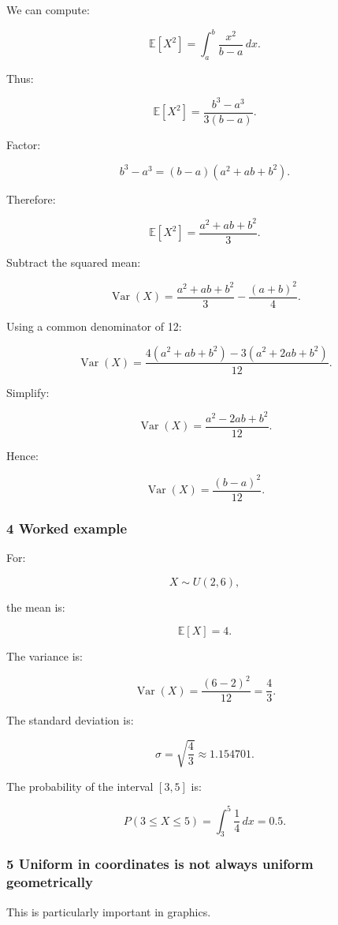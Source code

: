 We can compute:

\[
 \mathbb E[X^2] = \int_a^b\frac{x^2}{b-a}\,dx.
\]

Thus:

\[
 \mathbb E[X^2] = \frac{b^3-a^3}{3(b-a)}.
\]

Factor:

\[
 b^3-a^3=(b-a)(a^2+ab+b^2).
\]

Therefore:

\[
 \mathbb E[X^2] = \frac{a^2+ab+b^2}{3}.
\]

Subtract the squared mean:

\[
 \operatorname{Var}(X) = \frac{a^2+ab+b^2}{3} -\frac{(a+b)^2}{4}.
\]

Using a common denominator of 12:

\[
 \operatorname{Var}(X) = \frac{ 4(a^2+ab+b^2)-3(a^2+2ab+b^2) }{12}.
\]

Simplify:

\[
 \operatorname{Var}(X) = \frac{a^2-2ab+b^2}{12}.
\]

Hence:

\[
 \boxed{ \operatorname{Var}(X)=\frac{(b-a)^2}{12} }.
\]

\subsubsection{4 Worked example}\label{02-foundations-ii-ch023-worked-example-1}

For:

\[
 X\sim U(2,6),
\]

the mean is:

\[
 \mathbb E[X]=4.
\]

The variance is:

\[
 \operatorname{Var}(X) = \frac{(6-2)^2}{12} = \boxed{\frac43}.
\]

The standard deviation is:

\[
 \sigma=\sqrt{\frac43}\approx1.154701.
\]

The probability of the interval \([3,5]\) is:

\[
 P(3\le X\le5) = \int_3^5\frac14\,dx =\boxed{0.5}.
\]

\subsubsection{5 Uniform in coordinates is not always uniform geometrically}\label{02-foundations-ii-ch023-uniform-in-coordinates-is-not-always-uniform-geometrically}

This is particularly important in graphics.

